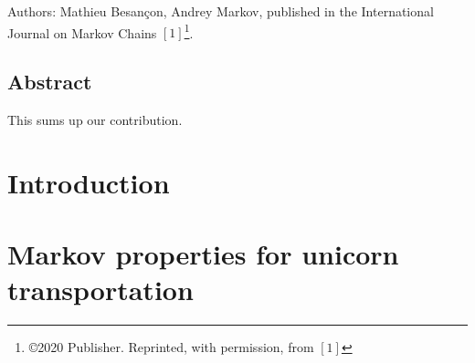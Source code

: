 
\label{chap:TLOUBilevel01}


Authors: Mathieu Besançon, Andrey Markov, published in the International Journal on Markov Chains $\left[1\right]$\footnote{\copyright 2020 Publisher. Reprinted, with permission, from $\left[1\right]$}.

\subsection*{Abstract}

This sums up our contribution.

\section{Introduction}

\section{Markov properties for unicorn transportation}\label{sec:unictransport}
